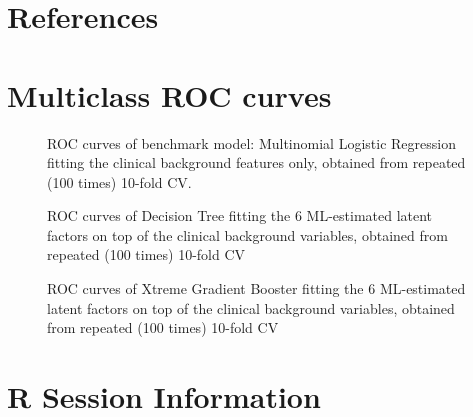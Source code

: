 \documentclass{amsart}
\begin{document}
\newpage
\section*{References}
\printbibliography[heading=none]
\clearpage
\appendix 
\clearpage
\section{Multiclass ROC curves} \label{appendixA}
\begin{figure}[htb]
  
  \caption{ROC curves of benchmark model: Multinomial Logistic Regression fitting the clinical background features only, obtained from repeated (100 times) 10-fold CV.}
  \label{roc:bench}
\end{figure}
\begin{figure}[htb]

\caption{ROC curves of Decision Tree fitting the 6 ML-estimated latent factors on top of the clinical background variables, obtained from repeated (100 times) 10-fold CV}
\label{roc:tree}
\end{figure}
\begin{figure}

\caption{ROC curves of Xtreme Gradient Booster fitting the 6 ML-estimated latent factors on top of the clinical background variables, obtained from repeated (100 times) 10-fold CV}
\label{roc:xgb}
\end{figure}

\clearpage
\section{R Session Information} \label{appendixB}
\end{document}
